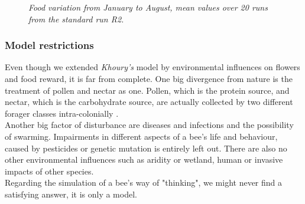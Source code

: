 		\begin{figure}[H]
			\centering
			\caption{\textit{Food variation from January to August, mean values over 20 runs from the standard run R2.}}
			\label{fig:foodVariation}
		\end{figure}
	
	\subsubsection{Model restrictions}
		\label{chap:modelRestrictions}
		Even though we extended \textit{Khoury's} model by environmental influences on flowers and food reward, it is far from complete. One big divergence from nature is the treatment of pollen and nectar as one. Pollen, which is the protein source, and nectar, which is the carbohydrate source, are actually collected by two different forager classes intra-colonially \cite{schmickl07}.\\  Another big factor of disturbance are diseases and infections and the possibility of swarming. Impairments in different aspects of a bee's life and behaviour, caused by pesticides or genetic mutation is entirely left out. There are also no other environmental influences such as aridity or wetland, human or invasive impacts of other species. \\
		Regarding the simulation of a bee's way of "thinking", we might never find a satisfying answer, it is only a model.
	
